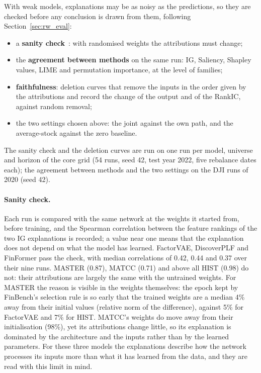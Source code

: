 With weak models, explanations may be as noisy as the predictions, so they are checked before any conclusion is drawn from them, following Section~\ref{sec:rw_eval}:
\begin{itemize}
    \item a \textbf{sanity check}~\cite{adebayo2018sanity}: with randomised weights the attributions must change;
    \item the \textbf{agreement between methods} on the same run: IG, Saliency, Shapley values, LIME and permutation importance, at the level of families;
    \item \textbf{faithfulness}: deletion curves that remove the inputs in the order given by the attributions and record the change of the output and of the RankIC, against random removal;
    \item the two settings chosen above: the joint against the own path, and the average-stock against the zero baseline.
\end{itemize}
The sanity check and the deletion curves are run on one run per model, universe and horizon of the core grid (54 runs, seed 42, test year 2022, five rebalance dates each); the agreement between methods and the two settings on the DJI runs of 2020 (seed 42).

\paragraph{Sanity check.} Each run is compared with the same network at the weights it started from, before training, and the Spearman correlation between the feature rankings of the two IG explanations is recorded; a value near one means that the explanation does not depend on what the model has learned. FactorVAE, DiscoverPLF and FinFormer pass the check, with median correlations of 0.42, 0.44 and 0.37 over their nine runs. MASTER (0.87), MATCC (0.71) and above all HIST (0.98) do not: their attributions are largely the same with the untrained weights. For MASTER the reason is visible in the weights themselves: the epoch kept by FinBench's selection rule is so early that the trained weights are a median 4\% away from their initial values (relative norm of the difference), against 5\% for FactorVAE and 7\% for HIST. MATCC's weights do move away from their initialisation (98\%), yet its attributions change little, so its explanation is dominated by the architecture and the inputs rather than by the learned parameters. For these three models the explanations describe how the network processes its inputs more than what it has learned from the data, and they are read with this limit in mind.

